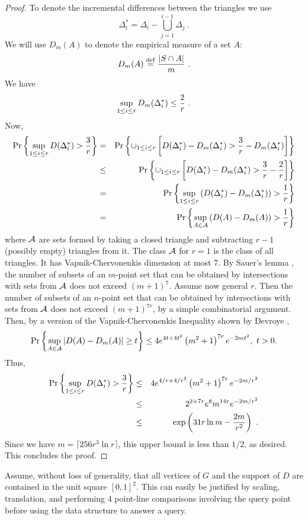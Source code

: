 \documentclass{patmorin}
\begin{document}
\begin{proof}
To denote the incremental differences between the triangles we use
$$\Delta_i^* = \Delta_i - \bigcup_{j=1}^{i-1} \Delta_j ~.$$  We will
use $D_m(A)$ to denote the empirical measure of a set $A$:
\[
D_m (A) \isdef {{|S\cap A|} \over m}
~.
\]  
We have
\[
\sup_{1 \le i \le r} D_m(\Delta_i^*) \le { 2 \over r }~.
\]
Now,
\begin{eqnarray*}
\Pr \left\{ \sup_{1 \le i \le r} D ( \Delta^*_i ) > {3 \over r} \right\}
&=& \Pr \left\{ \cup_{1 \le i \le r} \left[ D ( \Delta^*_i ) - D_m(\Delta_i^*)  >  {3 \over r} - D_m(\Delta_i^*) \right] \right\} \cr
&\le& \Pr \left\{ \cup_{1 \le i \le r} \left[ D ( \Delta^*_i ) - D_m(\Delta_i^*)  > {3 \over r} - {2 \over r}  \right] \right\} \cr
&=& \Pr \left\{ \sup_{1 \le i \le r} \left(  D ( \Delta^*_i ) - D_m(\Delta_i^*) \right) > {1 \over r} \right\} \cr
&=& \Pr \left\{ \sup_{A \in {\cal A}} \left( D ( A ) - D_m ( A ) \right)  > {1 \over r} \right\} \cr
\end{eqnarray*}
where $\cal A$ are sets formed by taking a closed triangle and subtracting
$r-1$  (possibly empty) triangles from it.
The class $\cal A$ for $r=1$ is the class of all triangles.
It has Vapnik-Chervonenkis dimension at most 7. 
By Sauer's  lemma 
\cite{s72}\cite[Pages~28--29]{dl01},
the number of subsets of an $m$-point set that can be obtained by intersections
with sets from $\cal A$ does not exceed $(m+1)^7$.
Assume now general $r$. Then the number of subsets of an $n$-point set that can be obtained by intersections
with sets from $\cal A$ does not exceed $(m+1)^{7r}$,
by a simple combinatorial argument.
Then, by a version of the Vapnik-Chervonenkis Inequality 
\cite{vc71} shown by Devroye \cite{d82},
$$
\Pr \left\{ \sup_{A \in {\cal A}} \left| D ( A ) - D_m ( A ) \right|  \ge t \right\}
\le 4 e^{4t+4t^2} \left( m^2 + 1 \right)^{7r}  e^{-2mt^2}, ~t > 0.
$$
Thus, 
\begin{eqnarray*}
\Pr \left\{ \sup_{1 \le i \le r} D ( \Delta^*_i )  > {3 \over r} \right\}
&\le& 4 e^{4/r + 4/r^2} \left( m^2 + 1 \right)^{7r}  e^{-2m/r^2} \\
&\le& 2^{2+7r}  e^{8}  m^{14r}  e^{-2m/r^2} \\
&\le& \exp \left( 31r\ln m - \frac{2m}{r^2} \right)  ~.
\end{eqnarray*}
Since we have $m=\lceil 256r^3\ln r \rceil$, this upper bound is less than $1/2$, as desired.  This concludes the proof.
\end{proof}

Assume, without loss of generality, that all vertices of $G$ and the support
of $D$ are contained in the unit square $[0,1]^2$.  This can easily be
justified by scaling, translation, and performing 4 point-line comparisons
involving the query point before using the data structure to answer a query.
\end{document}
